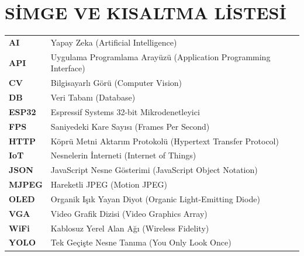 \section*{SİMGE VE KISALTMA LİSTESİ}

\begin{tabular}{ll}
\textbf{AI}     & Yapay Zeka (Artificial Intelligence) \\
\textbf{API}    & Uygulama Programlama Arayüzü (Application Programming Interface) \\
\textbf{CV}     & Bilgisayarlı Görü (Computer Vision) \\
\textbf{DB}     & Veri Tabanı (Database) \\
\textbf{ESP32}  & Espressif Systems 32-bit Mikrodenetleyici \\
\textbf{FPS}    & Saniyedeki Kare Sayısı (Frames Per Second) \\
\textbf{HTTP}   & Köprü Metni Aktarım Protokolü (Hypertext Transfer Protocol) \\
\textbf{IoT}    & Nesnelerin İnterneti (Internet of Things) \\
\textbf{JSON}   & JavaScript Nesne Gösterimi (JavaScript Object Notation) \\
\textbf{MJPEG}  & Hareketli JPEG (Motion JPEG) \\
\textbf{OLED}   & Organik Işık Yayan Diyot (Organic Light-Emitting Diode) \\
\textbf{VGA}    & Video Grafik Dizisi (Video Graphics Array) \\
\textbf{WiFi}   & Kablosuz Yerel Alan Ağı (Wireless Fidelity) \\
\textbf{YOLO}   & Tek Geçişte Nesne Tanıma (You Only Look Once) \\
\end{tabular}
